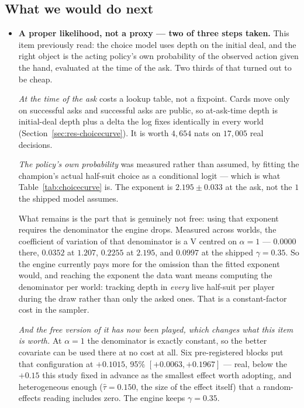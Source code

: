 \documentclass[11pt,a4paper]{article}
\begin{document}
\subsection{What we would do next}

\begin{itemize}
\item \textbf{A proper likelihood, not a proxy --- two of three steps taken.}
This item previously read: the choice model uses depth on the initial deal, and
the right object is the acting policy's own probability of the observed action
given the hand, evaluated at the time of the ask. Two thirds of that turned out
to be cheap.

\emph{At the time of the ask} costs a lookup table, not a fixpoint. Cards move
only on successful asks and successful asks are public, so at-ask-time depth is
initial-deal depth plus a delta the log fixes identically in every world
(Section~\ref{sec:res-choicecurve}). It is worth $4{,}654$ nats on
$17{,}005$ real decisions.

\emph{The policy's own probability} was measured rather than assumed, by fitting
the champion's actual half-suit choice as a conditional logit --- which is what
Table~\ref{tab:choicecurve} is. The exponent is $2.195 \pm 0.033$ at the ask,
not the $1$ the shipped model assumes.

What remains is the part that is genuinely not free: using that exponent
requires the denominator the engine drops. Measured across worlds, the
coefficient of variation of that denominator is a V centred on $\alpha = 1$ ---
$0.0000$ there, $0.0352$ at $1.207$, $0.2255$ at $2.195$, and $0.0997$ at the
shipped $\gamma = 0.35$. So the engine currently pays more for the omission than
the fitted exponent would, and reaching the exponent the data want means
computing the denominator per world: tracking depth in \emph{every} live
half-suit per player during the draw rather than only the asked ones. That is a
constant-factor cost in the sampler.

\emph{And the free version of it has now been played, which changes what this
item is worth.} At $\alpha = 1$ the denominator is exactly constant, so the
better covariate can be used there at no cost at all. Six pre-registered blocks
put that configuration at $+0.1015$, 95\% $[+0.0063, +0.1967]$ --- real, below
the $+0.15$ this study fixed in advance as the smallest effect worth adopting,
and heterogeneous enough ($\hat\tau = 0.150$, the size of the effect itself) that
a random-effects reading includes zero. The engine keeps $\gamma = 0.35$.


\end{itemize}
\end{document}

